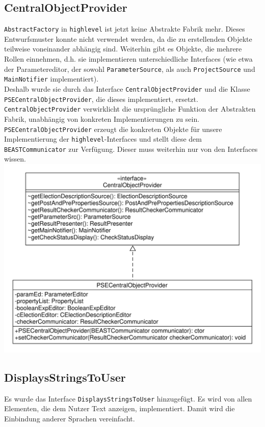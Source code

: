 \documentclass[a4paper]{scrreprt}
\begin{document}
\subsection{CentralObjectProvider}
\verb!AbstractFactory! in \verb!highlevel! ist jetzt keine Abstrakte Fabrik mehr. Dieses Entwurfsmuster konnte nicht verwendet werden, da die zu erstellenden Objekte teilweise voneinander abhängig sind. Weiterhin gibt es Objekte, die mehrere Rollen einnehmen, d.h. sie implementieren unterschiedliche Interfaces (wie etwa der Parametereditor, der sowohl \verb!ParameterSource!, als auch \verb!ProjectSource! und \verb!MainNotifier! implementiert). \\
Deshalb wurde sie durch das Interface \verb!CentralObjectProvider! und die Klasse\\ \verb!PSECentralObjectProvider!, die dieses implementiert, ersetzt. \verb!CentralObjectProvider! verwirklicht die ursprüngliche Funktion der Abstrakten Fabrik, unabhängig von konkreten Implementierungen zu sein. \\
\verb!PSECentralObjectProvider! erzeugt die konkreten Objekte für unsere Implementierung der \verb!highlevel!-Interfaces und stellt diese dem \verb!BEASTCommunicator! zur Verfügung. Dieser muss weiterhin nur von den Interfaces wissen. \\
\includegraphics[scale=0.5]{CentralObjectProvider.pdf}

\subsection{DisplaysStringsToUser}
Es wurde das Interface \verb!DisplaysStringsToUser! hinzugefügt. Es wird von allen Elementen, die dem Nutzer Text anzeigen, implementiert. Damit wird die Einbindung anderer Sprachen vereinfacht. \\
\end{document}
